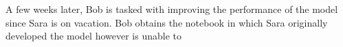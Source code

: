 

A few weeks later, Bob is tasked with improving the performance of the model since Sara is on vacation. Bob obtains the notebook in which Sara originally developed the model however is unable to





